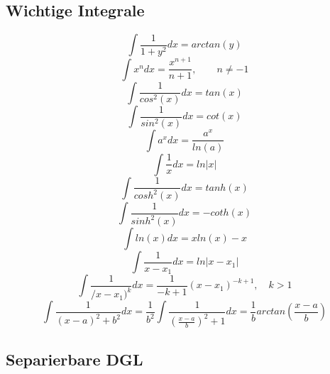\documentclass[12pt,a4paper]{report}%
\numberwithin{equation}{section}
\numberwithin{equation}{subsection}
\begin{document}
\subsection{Wichtige Integrale}
\begin{equation}
  \int \frac{1}{1+y^2} dx = arctan(y)
\end{equation}
\begin{equation}
  \int x^n dx = \frac{x^{n+1}}{n+1}, \qquad n \neq -1
\end{equation}
\begin{equation}
  \int \frac{1}{cos^2(x)} dx = tan(x)
\end{equation}
\begin{equation}
  \int \frac{1}{sin^2(x)} dx = cot(x)
\end{equation}
\begin{equation}
  \int a^x dx = \frac{a^x}{ln(a)}
\end{equation}
\begin{equation}
  \int \frac{1}{x} dx = ln|x|
\end{equation}
\begin{equation}
  \int \frac{1}{cosh^2(x)} dx = tanh(x)
\end{equation}
\begin{equation}
  \int \frac{1}{sinh^2(x)} dx = -coth(x)
\end{equation}
\begin{equation}
  \int ln(x) dx = x ln(x) -x
\end{equation}
\begin{equation}
  \int \frac{1}{x-x_1} dx = ln|x-x_1|
\end{equation}
\begin{equation}
  \int \frac{1}{/x-x_1)^k} dx = \frac{1}{-k+1}(x-x_1)^{-k+1}, \quad k>1
\end{equation}
\begin{equation}
  \int \frac{1}{(x-a)^2+b^2}dx = \frac{1}{b^2} \int \frac{1}{\left(\frac{x-a}{b}\right)^2 +1} dx = \frac{1}{b} arctan\left(\frac{x-a}{b}\right)
\end{equation}

\subsection{Separierbare DGL}
\end{document}
